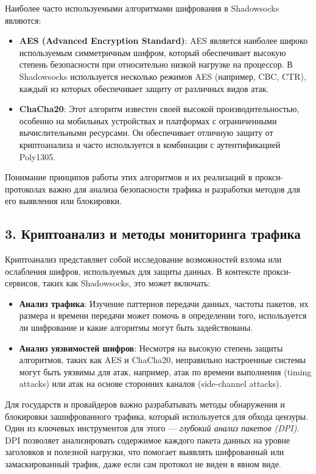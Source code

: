 \documentclass[a4paper,12pt]{article}
\begin{document}
Наиболее часто используемыми алгоритмами шифрования в Shadowsocks являются:

\begin{itemize}
    \item \textbf{AES (Advanced Encryption Standard)}: AES является наиболее широко используемым симметричным шифром, который обеспечивает высокую степень безопасности при относительно низкой нагрузке на процессор. В Shadowsocks используется несколько режимов AES (например, CBC, CTR), каждый из которых обеспечивает защиту от различных видов атак.
    \item \textbf{ChaCha20}: Этот алгоритм известен своей высокой производительностью, особенно на мобильных устройствах и платформах с ограниченными вычислительными ресурсами. Он обеспечивает отличную защиту от криптоанализа и часто используется в комбинации с аутентификацией Poly1305.
\end{itemize}

Понимание принципов работы этих алгоритмов и их реализаций в прокси-протоколах важно для анализа безопасности трафика и разработки методов для его выявления или блокировки.

\subsection*{3. Криптоанализ и методы мониторинга трафика}

Криптоанализ представляет собой исследование возможностей взлома или ослабления шифров, используемых для защиты данных. В контексте прокси-сервисов, таких как Shadowsocks, это может включать:

\begin{itemize}
    \item \textbf{Анализ трафика}: Изучение паттернов передачи данных, частоты пакетов, их размера и времени передачи может помочь в определении того, используется ли шифрование и какие алгоритмы могут быть задействованы.
    \item \textbf{Анализ уязвимостей шифров}: Несмотря на высокую степень защиты алгоритмов, таких как AES и ChaCha20, неправильно настроенные системы могут быть уязвимы для атак, например, атак по времени выполнения (timing attacks) или атак на основе сторонних каналов (side-channel attacks).
\end{itemize}

Для государств и провайдеров важно разрабатывать методы обнаружения и блокировки зашифрованного трафика, который используется для обхода цензуры. Один из ключевых инструментов для этого --- \textit{глубокий анализ пакетов (DPI)}. DPI позволяет анализировать содержимое каждого пакета данных на уровне заголовков и полезной нагрузки, что помогает выявлять шифрованный или замаскированный трафик, даже если сам протокол не виден в явном виде.
\end{document}
